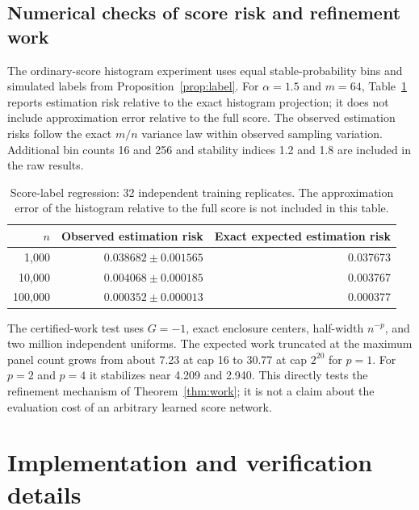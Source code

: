 \documentclass[11pt]{article}
\theoremstyle{definition}\newtheorem{definition}[theorem]{Definition}
\theoremstyle{remark}\newtheorem{remark}[theorem]{Remark}
\numberwithin{equation}{section}
\newcommand{\1}{\mathbf 1}
\begin{document}
\subsection{Numerical checks of score risk and refinement work}
The ordinary-score histogram experiment uses equal stable-probability bins and simulated labels from Proposition~\ref{prop:label}. For $\alpha=1.5$ and $m=64$, Table~\ref{tab:scorerisk} reports estimation risk relative to the exact histogram projection; it does not include approximation error relative to the full score. The observed estimation risks follow the exact $m/n$ variance law within observed sampling variation. Additional bin counts 16 and 256 and stability indices 1.2 and 1.8 are included in the raw results.
\begin{table}[!htbp]\centering
\caption{Score-label regression: 32 independent training replicates. The approximation error of the histogram relative to the full score is not included in this table.}\label{tab:scorerisk}
\begin{tabular}{@{}rrr@{}}\toprule
$n$ & Observed estimation risk & Exact expected estimation risk\\\midrule
1,000 &$0.038682\pm0.001565$&0.037673\\
10,000 &$0.004068\pm0.000185$&0.003767\\
100,000 &$0.000352\pm0.000013$&0.000377\\\bottomrule
\end{tabular}
\end{table}

The certified-work test uses $G=-1$, exact enclosure centers, half-width $n^{-p}$, and two million independent uniforms. The expected work truncated at the maximum panel count grows from about 7.23 at cap 16 to 30.77 at cap $2^{20}$ for $p=1$. For $p=2$ and $p=4$ it stabilizes near 4.209 and 2.940. This directly tests the refinement mechanism of Theorem~\ref{thm:work}; it is not a claim about the evaluation cost of an arbitrary learned score network.


\section{Implementation and verification details}\label{sec:repro}
\end{document}

